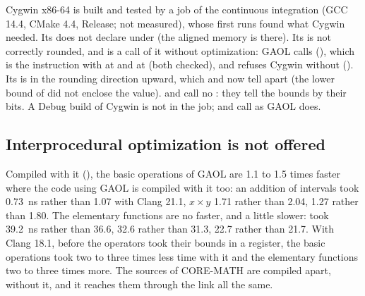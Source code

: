\documentclass[12pt,a4paper,twoside,openright]{book}
\begin{document}
\begin{Rem}
Cygwin x86-64 is built and tested by a job of the continuous integration (GCC
14.4, CMake 4.4, Release; not measured), whose first runs found what Cygwin
needed.\newinvfive{} Its  does not declare
 under  (the aligned memory is
 there). Its  is not correctly rounded, and
 is a call of it without optimization: GAOL calls
 (), which is the instruction with
 at  and at  (both checked), and
refuses Cygwin without  (). Its
 is  in the rounding
direction upward, which  and  now
tell apart (the lower bound of  did not enclose the value).
 and  call no : they
tell the bounds by their bits. A Debug build of Cygwin is not in the job;
 and  call
 as GAOL does.
\end{Rem}

\subsection{Interprocedural optimization is not offered}
\label{sec:install-ipo}
%

Compiled with it (), the basic operations of GAOL are 1.1 to
1.5 times faster where the code using GAOL is compiled with it too: an
addition of intervals took 0.73~ns rather than 1.07 with Clang 21.1,
$x \times y$ 1.71 rather than 2.04,  1.27 rather than 1.80. The
elementary functions are no faster, and a little slower:  took
39.2~ns rather than 36.6,  32.6 rather than 31.3,  22.7
rather than 21.7. With Clang 18.1, before the operators took their bounds in
a register, the basic operations took two to three times less time with it
and the elementary functions two to three times more. The sources of
CORE-MATH are compiled apart, without it, and it reaches them through the
link all the same.
\end{document}
